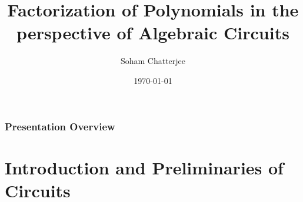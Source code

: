 \documentclass[10pt]{beamer}
\title[Algebraic Circuits Factorization]{Factorization of Polynomials in the perspective of Algebraic Circuits} %
\author[Soham Chatterjee]{Soham Chatterjee} %
\institute[CMI]{Chennai Mathematical Institute \\ \smallskip \textit{sohamchatterjee999@gmail.com}} %
\date[\today]{\today} %
\begin{document}

\begin{frame}
	\titlepage
\end{frame}



\begin{frame}
	\frametitle{Presentation Overview} %
	
	\tableofcontents %
\end{frame}


\section{Introduction and Preliminaries of Circuits} %
\end{document}
